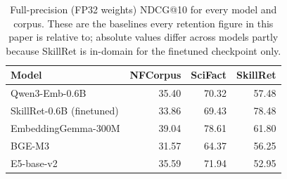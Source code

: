 \begin{table}[t]\centering\small
\caption{Full-precision (FP32 weights) NDCG@10 for every model and corpus. These are the
baselines every retention figure in this paper is relative to; absolute values differ across
models partly because SkillRet is in-domain for the finetuned checkpoint only.}
\label{tab:protocol}
\begin{tabular}{lrrr}
\toprule
Model & NFCorpus & SciFact & SkillRet \\
\midrule
Qwen3-Emb-0.6B & 35.40 & 70.32 & 57.48 \\
SkillRet-0.6B (finetuned) & 33.86 & 69.43 & 78.48 \\
EmbeddingGemma-300M & 39.04 & 78.61 & 61.80 \\
BGE-M3 & 31.57 & 64.37 & 56.25 \\
E5-base-v2 & 35.59 & 71.94 & 52.95 \\
\bottomrule
\end{tabular}\end{table}